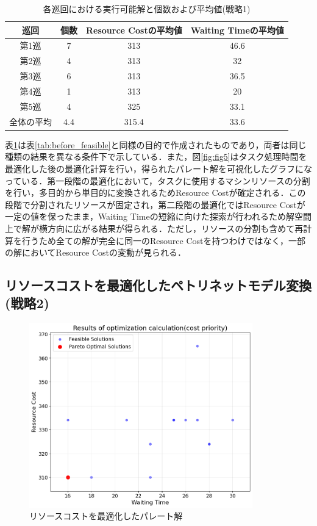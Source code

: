 \begin{table}[ht]
    \centering
    \vspace{-0.3cm}
    \caption{各巡回における実行可能解と個数および平均値(戦略1)}
    \begin{tabular}{|c|c|c|c|}
        \hline
         巡回 & 個数 & Resource Costの平均値 & Waiting Timeの平均値 \\
        \hline
        第1巡 & 7 & 313 & 46.6 \\
        \hline
        第2巡 & 4 & 313 & 32 \\
        \hline
        第3巡 & 6 & 313 & 36.5 \\
        \hline
        第4巡 & 1 & 313 & 20 \\
        \hline
        第5巡 & 4 & 325 & 33.1 \\
        \hline
        全体の平均 & 4.4 & 315.4 & 33.6 \\
        \hline
    \end{tabular}
    \label{tab:task_feasible}
\end{table}

表\ref{tab:task_feasible}は表\ref{tab:before_feasible}と同様の目的で作成されたものであり，両者は同じ種類の結果を異なる条件下で示している．また，図\ref{fig:fig5}はタスク処理時間を最適化した後の最適化計算を行い，得られたパレート解を可視化したグラフになっている．第一段階の最適化において，タスクに使用するマシンリソースの分割を行い，多目的から単目的に変換されるためResource Costが確定される．この段階で分割されたリソースが固定され，第二段階の最適化ではResource Costが一定の値を保ったまま，Waiting Timeの短縮に向けた探索が行われるため解空間上で解が横方向に広がる結果が得られる．ただし，リソースの分割も含めて再計算を行うため全ての解が完全に同一のResource Costを持つわけではなく，一部の解においてResource Costの変動が見られる．
 
\subsection{リソースコストを最適化したペトリネットモデル変換(戦略2)}

\begin{figure}[H]
    \centering
    \includegraphics[width=0.8\linewidth, height=8cm]{./images/cost.png}
    \caption{リソースコストを最適化したパレート解}
    \label{fig:fig6}
\end{figure}

